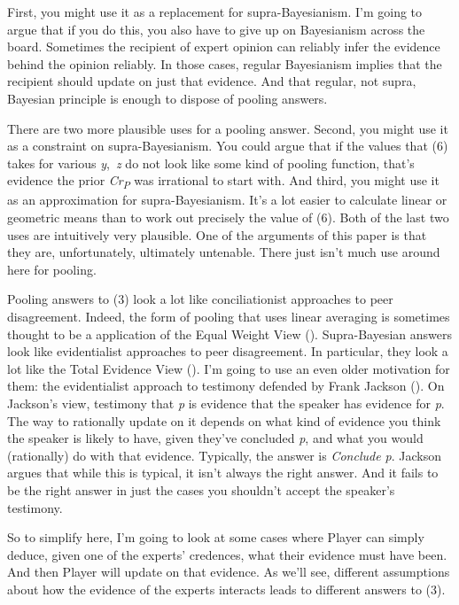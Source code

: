 \documentclass[
  10pt,
  letterpaper,
  DIV=11,
  numbers=noendperiod,
  twoside]{scrartcl}
\begin{document}
First, you might use it as a replacement for supra-Bayesianism. I'm
going to argue that if you do this, you also have to give up on
Bayesianism across the board. Sometimes the recipient of expert opinion
can reliably infer the evidence behind the opinion reliably. In those
cases, regular Bayesianism implies that the recipient should update on
just that evidence. And that regular, not supra, Bayesian principle is
enough to dispose of pooling answers.

There are two more plausible uses for a pooling answer. Second, you
might use it as a constraint on supra-Bayesianism. You could argue that
if the values that (6) takes for various \emph{y},~\emph{z} do not look
like some kind of pooling function, that's evidence the prior
\emph{Cr\textsubscript{P}} was irrational to start with. And third, you
might use it as an approximation for supra-Bayesianism. It's a lot
easier to calculate linear or geometric means than to work out precisely
the value of (6). Both of the last two uses are intuitively very
plausible. One of the arguments of this paper is that they are,
unfortunately, ultimately untenable. There just isn't much use around
here for pooling.

Pooling answers to (3) look a lot like conciliationist approaches to
peer disagreement. Indeed, the form of pooling that uses linear
averaging is sometimes thought to be a application of the Equal Weight
View (). Supra-Bayesian answers look
like evidentialist approaches to peer disagreement. In particular, they
look a lot like the Total Evidence View
(). I'm going to use an
even older motivation for them: the evidentialist approach to testimony
defended by Frank Jackson (). On
Jackson's view, testimony that \emph{p} is evidence that the speaker has
evidence for \emph{p}. The way to rationally update on it depends on
what kind of evidence you think the speaker is likely to have, given
they've concluded \emph{p}, and what you would (rationally) do with that
evidence. Typically, the answer is \emph{Conclude p}. Jackson argues
that while this is typical, it isn't always the right answer. And it
fails to be the right answer in just the cases you shouldn't accept the
speaker's testimony.

So to simplify here, I'm going to look at some cases where Player can
simply deduce, given one of the experts' credences, what their evidence
must have been. And then Player will update on that evidence. As we'll
see, different assumptions about how the evidence of the experts
interacts leads to different answers to (3).
\end{document}

